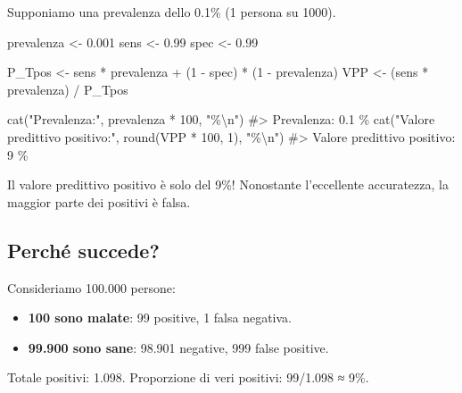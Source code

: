 \documentclass[
  italian,
  letterpaper,
  a4paper,
  11pt,
  open=any]{scrbook}
\newenvironment{Shaded}{\begin{snugshade}}{\end{snugshade}}
\newcommand{\CommentTok}[1]{\textcolor[rgb]{0.37,0.37,0.37}{#1}}
\newcommand{\DecValTok}[1]{\textcolor[rgb]{0.68,0.00,0.00}{#1}}
\newcommand{\FloatTok}[1]{\textcolor[rgb]{0.68,0.00,0.00}{#1}}
\newcommand{\FunctionTok}[1]{\textcolor[rgb]{0.28,0.35,0.67}{#1}}
\newcommand{\NormalTok}[1]{\textcolor[rgb]{0.00,0.23,0.31}{#1}}
\newcommand{\OtherTok}[1]{\textcolor[rgb]{0.00,0.23,0.31}{#1}}
\newcommand{\SpecialCharTok}[1]{\textcolor[rgb]{0.37,0.37,0.37}{#1}}
\newcommand{\StringTok}[1]{\textcolor[rgb]{0.13,0.47,0.30}{#1}}
\providecommand{\tightlist}{%
  \setlength{\itemsep}{0pt}\setlength{\parskip}{0pt}}
\theoremstyle{plain}
\theoremstyle{definition}
\theoremstyle{definition}
\theoremstyle{remark}
\begin{document}
Supponiamo una prevalenza dello 0.1\% (1 persona su 1000).

\begin{Shaded}
\begin{Highlighting}[]
\NormalTok{prevalenza }\OtherTok{\textless{}{-}} \FloatTok{0.001}
\NormalTok{sens }\OtherTok{\textless{}{-}} \FloatTok{0.99}
\NormalTok{spec }\OtherTok{\textless{}{-}} \FloatTok{0.99}

\NormalTok{P\_Tpos }\OtherTok{\textless{}{-}}\NormalTok{ sens }\SpecialCharTok{*}\NormalTok{ prevalenza }\SpecialCharTok{+}\NormalTok{ (}\DecValTok{1} \SpecialCharTok{{-}}\NormalTok{ spec) }\SpecialCharTok{*}\NormalTok{ (}\DecValTok{1} \SpecialCharTok{{-}}\NormalTok{ prevalenza)}
\NormalTok{VPP }\OtherTok{\textless{}{-}}\NormalTok{ (sens }\SpecialCharTok{*}\NormalTok{ prevalenza) }\SpecialCharTok{/}\NormalTok{ P\_Tpos}

\FunctionTok{cat}\NormalTok{(}\StringTok{"Prevalenza:"}\NormalTok{, prevalenza }\SpecialCharTok{*} \DecValTok{100}\NormalTok{, }\StringTok{"\%}\SpecialCharTok{\textbackslash{}n}\StringTok{"}\NormalTok{)}
\CommentTok{\#\textgreater{} Prevalenza: 0.1 \%}
\FunctionTok{cat}\NormalTok{(}\StringTok{"Valore predittivo positivo:"}\NormalTok{, }\FunctionTok{round}\NormalTok{(VPP }\SpecialCharTok{*} \DecValTok{100}\NormalTok{, }\DecValTok{1}\NormalTok{), }\StringTok{"\%}\SpecialCharTok{\textbackslash{}n}\StringTok{"}\NormalTok{)}
\CommentTok{\#\textgreater{} Valore predittivo positivo: 9 \%}
\end{Highlighting}
\end{Shaded}

Il valore predittivo positivo è solo del 9\%! Nonostante l'eccellente
accuratezza, la maggior parte dei positivi è falsa.

\subsection{Perché succede?}\label{perchuxe9-succede}

Consideriamo 100.000 persone:

\begin{itemize}
\tightlist
\item
  \textbf{100 sono malate}: 99 positive, 1 falsa negativa.
\item
  \textbf{99.900 sono sane}: 98.901 negative, 999 false positive.
\end{itemize}

Totale positivi: 1.098. Proporzione di veri positivi: 99/1.098 ≈ 9\%.
\end{document}
